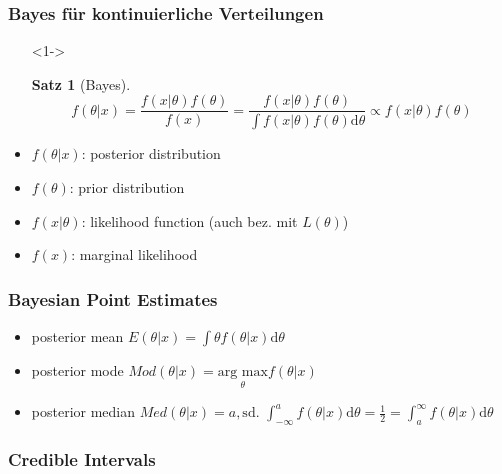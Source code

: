 \documentclass[aspectratio=169,xcolor=dvipsnames]{beamer}
\newtheorem{satz}{Satz}
\begin{document}
\begin{frame}
\frametitle{Bayes für kontinuierliche Verteilungen}
\begin{itemize}
	\item[]<1-> \begin{satz}[Bayes]
		$$f(\theta|x)=\frac{f(x|\theta)f(\theta)}{f(x)}=\frac{f(x|\theta)f(\theta)}{\int f(x|\theta)f(\theta)\text{d}\theta}\propto f(x|\theta)f(\theta)$$
	\end{satz}
	\item<2-> $f(\theta|x)$: posterior distribution
	\item<2-> $f(\theta)$: prior distribution
	\item<2-> $f(x|\theta)$: likelihood function (auch bez. mit $L(\theta)$)
	\item<2-> $f(x)$: marginal likelihood
\end{itemize}
\end{frame}

\begin{frame}
\frametitle{Bayesian Point Estimates}
\begin{itemize}
	\item<1-> posterior mean $E(\theta|x)=\int \theta f(\theta|x)\text{d}\theta$
	\item<2-> posterior mode $Mod(\theta|x) = \underset{\theta}{\text{arg max}} f(\theta|x)$
	\item<3-> posterior median $Med(\theta|x) = a, \text{sd. } \int_{-\infty}^{a}f(\theta|x)\text{d}\theta = \frac{1}{2} = \int_{a}^{\infty}f(\theta|x)\text{d}\theta$
\end{itemize}
\end{frame}

\begin{frame}
\frametitle{Credible Intervals}

\end{frame}
\end{document}
